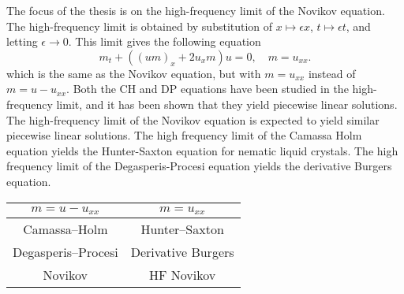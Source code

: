 \documentclass[english,master]{liumaiex}
\theoremstyle{plain}
\theoremstyle{definition}
\begin{document}
The focus of the thesis is on the high-frequency limit of the Novikov equation. The high-frequency limit is obtained by substitution of $x \mapsto \epsilon x$, $t \mapsto \epsilon t$, and letting $\epsilon \rightarrow 0$. This limit gives the following equation
\begin{equation} \label{eq:Novikov_high_freq}
	m_t + ((um)_x + 2u_xm) u = 0,\quad m = u_{xx}.
\end{equation}
which is the same as the Novikov equation, but with $m = u_{xx}$ instead of $m = u - u_{xx}$. Both the CH and DP equations have been studied in the high-frequency limit, and it has been shown that they yield piecewise linear solutions. The high-frequency limit of the Novikov equation is expected to yield similar piecewise linear solutions. The high frequency limit of the Camassa Holm equation yields the Hunter-Saxton equation\cite{HunterSaxton_1991,HunterZheng1994} for nematic liquid crystals. The high frequency limit of the Degasperis-Procesi equation yields the derivative Burgers equation\cite{Kohlenberg_2007, Lundmark_2008}.
\begin{center}
  \begin{tabular}{c|c}
    $m=u-u_{xx}$ & $m=u_{xx}$ \\
    \hline
    Camassa--Holm & Hunter--Saxton \\
    \hline
    Degasperis--Procesi & Derivative Burgers \\
    \hline
    Novikov & HF Novikov \\
  \end{tabular}
\end{center}
\end{document}
